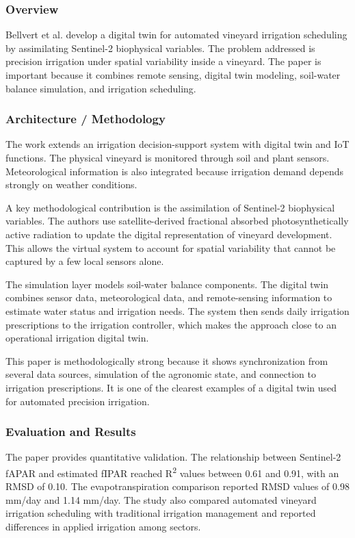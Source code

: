 \subsubsection{Overview}

Bellvert et al. develop a digital twin for automated vineyard irrigation scheduling by assimilating Sentinel-2 biophysical variables. The problem addressed is precision irrigation under spatial variability inside a vineyard. The paper is important because it combines remote sensing, digital twin modeling, soil-water balance simulation, and irrigation scheduling.

\subsubsection{Architecture / Methodology}

The work extends an irrigation decision-support system with digital twin and IoT functions. The physical vineyard is monitored through soil and plant sensors. Meteorological information is also integrated because irrigation demand depends strongly on weather conditions.

A key methodological contribution is the assimilation of Sentinel-2 biophysical variables. The authors use satellite-derived fractional absorbed photosynthetically active radiation to update the digital representation of vineyard development. This allows the virtual system to account for spatial variability that cannot be captured by a few local sensors alone.

The simulation layer models soil-water balance components. The digital twin combines sensor data, meteorological data, and remote-sensing information to estimate water status and irrigation needs. The system then sends daily irrigation prescriptions to the irrigation controller, which makes the approach close to an operational irrigation digital twin.

This paper is methodologically strong because it shows synchronization from several data sources, simulation of the agronomic state, and connection to irrigation prescriptions. It is one of the clearest examples of a digital twin used for automated precision irrigation.

\subsubsection{Evaluation and Results}

The paper provides quantitative validation. The relationship between Sentinel-2 fAPAR and estimated fIPAR reached R\textsuperscript{2} values between 0.61 and 0.91, with an RMSD of 0.10. The evapotranspiration comparison reported RMSD values of 0.98 mm/day and 1.14 mm/day. The study also compared automated vineyard irrigation scheduling with traditional irrigation management and reported differences in applied irrigation among sectors.

